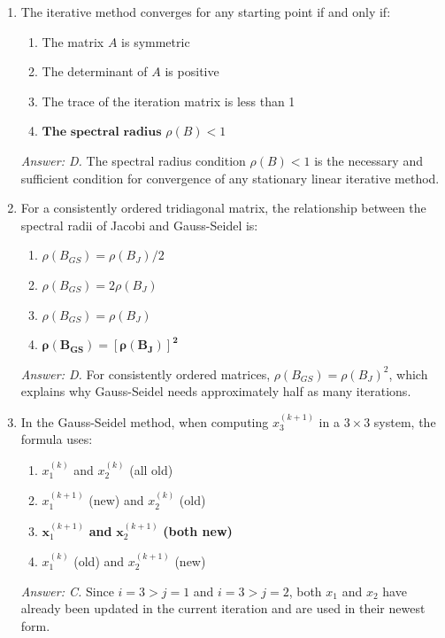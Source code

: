 \documentclass[12pt,a4paper]{article}
\begin{document}
\begin{enumerate}
\item The iterative method converges for any starting point if and only if:
\begin{enumerate}[label=\Alph*.]
  \item The matrix \(A\) is symmetric
  \item The determinant of \(A\) is positive
  \item The trace of the iteration matrix is less than 1
  \item \(\textbf{The spectral radius } \rho(B) < 1\)
\end{enumerate}
\textit{Answer: D.} The spectral radius condition \(\rho(B) < 1\) is the necessary and
sufficient condition for convergence of any stationary linear iterative method.

\item For a consistently ordered tridiagonal matrix, the relationship between the spectral
radii of Jacobi and Gauss-Seidel is:
\begin{enumerate}[label=\Alph*.]
  \item \(\rho(B_{GS}) = \rho(B_J) / 2\)
  \item \(\rho(B_{GS}) = 2\rho(B_J)\)
  \item \(\rho(B_{GS}) = \rho(B_J)\)
  \item \(\boldsymbol{\rho(B_{GS}) = [\rho(B_J)]^2}\)
\end{enumerate}
\textit{Answer: D.} For consistently ordered matrices, \(\rho(B_{GS}) = \rho(B_J)^2\),
which explains why Gauss-Seidel needs approximately half as many iterations.

\item In the Gauss-Seidel method, when computing \(x_3^{(k+1)}\) in a \(3 \times 3\) system,
the formula uses:
\begin{enumerate}[label=\Alph*.]
  \item \(x_1^{(k)}\) and \(x_2^{(k)}\) (all old)
  \item \(x_1^{(k+1)}\) (new) and \(x_2^{(k)}\) (old)
  \item \(\textbf{x}_1^{(k+1)}\) \textbf{and} \(\mathbf{x}_2^{(k+1)}\) \textbf{(both new)}
  \item \(x_1^{(k)}\) (old) and \(x_2^{(k+1)}\) (new)
\end{enumerate}
\textit{Answer: C.} Since \(i=3 > j=1\) and \(i=3 > j=2\), both \(x_1\) and \(x_2\)
have already been updated in the current iteration and are used in their newest form.

\end{enumerate}
\end{document}
